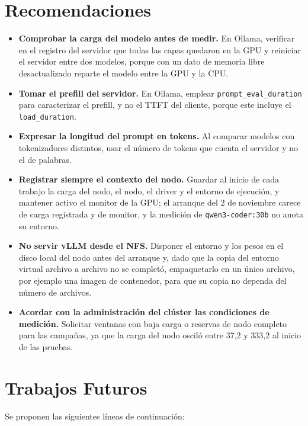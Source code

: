 \section{Recomendaciones}
\label{sec:cap4:recomendaciones}

\begin{itemize}
  \item \textbf{Comprobar la carga del modelo antes de medir.} En Ollama, verificar en el registro del servidor que todas las capas quedaron en la GPU y reiniciar el servidor entre dos modelos, porque con un dato de memoria libre desactualizado reparte el modelo entre la GPU y la CPU.
  \item \textbf{Tomar el prefill del servidor.} En Ollama, emplear \texttt{prompt\_\allowbreak eval\_\allowbreak duration} para caracterizar el prefill, y no el TTFT del cliente, porque este incluye el \texttt{load\_duration}.
  \item \textbf{Expresar la longitud del prompt en tokens.} Al comparar modelos con tokenizadores distintos, usar el número de tokens que cuenta el servidor y no el de palabras.
  \item \textbf{Registrar siempre el contexto del nodo.} Guardar al inicio de cada trabajo la carga del nodo, el nodo, el driver y el entorno de ejecución, y mantener activo el monitor de la GPU; el arranque del 2 de noviembre carece de carga registrada y de monitor, y la medición de \texttt{qwen3-\allowbreak coder:\allowbreak 30b} no anota su entorno.
  \item \textbf{No servir vLLM desde el NFS.} Disponer el entorno y los pesos en el disco local del nodo antes del arranque y, dado que la copia del entorno virtual archivo a archivo no se completó, empaquetarlo en un único archivo, por ejemplo una imagen de contenedor, para que su copia no dependa del número de archivos.
  \item \textbf{Acordar con la administración del clúster las condiciones de medición.} Solicitar ventanas con baja carga o reservas de nodo completo para las campañas, ya que la carga del nodo osciló entre 37,2 y 333,2 al inicio de las pruebas.
\end{itemize}

\section{Trabajos Futuros}
\label{sec:cap4:futuros}

Se proponen las siguientes líneas de continuación:

